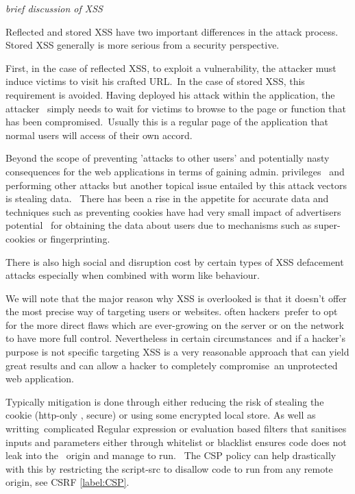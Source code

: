 \emph{brief discussion of XSS}

Reflected and stored XSS have two important differences in the attack process. Stored XSS generally is more serious from a security perspective.

First, in the case of reflected XSS, to exploit a vulnerability, the attacker must induce victims to visit his crafted URL.\
In the case of stored XSS, this requirement is avoided. Having deployed his attack within the application, the attacker \
simply needs to wait for victims to browse to the page or function that has been compromised.\
Usually this is a regular page of the application that normal users will access of their own accord.\

Beyond the scope of preventing 'attacks to other users' and potentially nasty consequences for the web applications in terms of gaining admin. privileges \
and performing other attacks but another topical issue entailed by this attack vectors is stealing data. \
There has been a rise in the appetite for accurate data and techniques such as preventing cookies have had very small impact of advertisers potential \
for obtaining the data about users due to mechanisms such as super-cookies or fingerprinting. \

There is also high social and disruption cost by certain types of XSS defacement attacks especially when combined with worm like behaviour.\

We will note that the major reason why XSS is overlooked is that it doesn't offer the most precise way of targeting users or websites. often hackers\
prefer to opt for the more direct flaws which are ever-growing on the server or on the network to have more full control. Nevertheless in certain circumstances\
and if a hacker's purpose is not specific targeting XSS is a very reasonable approach that can yield great results and can allow a hacker to completely compromise\
an unprotected web application.\ 

Typically mitigation is done through either reducing the risk of stealing the cookie (http-only , secure) or using some encrypted local store. As well as writting\
complicated Regular expression or evaluation based filters that sanitises inputs and parameters either through whitelist or blacklist ensures code does not leak into the \
origin and manage to run. \
The CSP policy can help drastically with this by restricting the script-src to disallow code to run from any remote origin, see CSRF \ref{label:CSP}.\\

